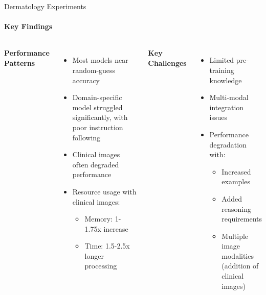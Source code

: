 \documentclass[aspectratio=169]{beamer}
\newcommand\customcolumnwidth{0.4625\textwidth}
\begin{document}
\begin{frame}{Dermatology Experiments}
\framesubtitle{Key Findings}
  \begin{columns}[T]
    \column{\customcolumnwidth}
      \textbf{Performance Patterns}
      \begin{itemize}
        \item Most models near random-guess accuracy
        \item Domain-specific model struggled significantly, with poor instruction following
        \item Clinical images often degraded performance
        \item Resource usage with clinical images:
        \begin{itemize}
          \item Memory: 1-1.75x increase
          \item Time: 1.5-2.5x longer processing
        \end{itemize}
      \end{itemize}
    \column{\customcolumnwidth}
      \textbf{Key Challenges}
      \begin{itemize}
        \item Limited pre-training knowledge
        \item Multi-modal integration issues
        \item Performance degradation with:
        \begin{itemize}
          \item Increased examples
          \item Added reasoning requirements
          \item Multiple image modalities (addition of clinical images)
        \end{itemize}
      \end{itemize}
  \end{columns}
\end{frame}
\end{document}
